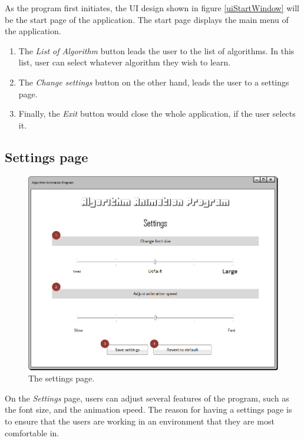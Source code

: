 As the program first initiates, the UI design shown in figure \ref{uiStartWindow} will be the start page of the application. The start page displays the main menu of the application. 

\begin{enumerate}
\item The \textit{List of Algorithm} button leads the user to the list of algorithms. In this list, user can select whatever algorithm they wish to learn. 
\item The \textit{Change settings} button on the other hand, leads the user to a settings page.
\item Finally, the \textit{Exit} button would close the whole application, if the user selects it.
\end{enumerate}

\newpage

\subsection{Settings page}

\begin{figure}[H]
\centering
\hspace*{-0.5cm}
\includegraphics[scale=0.8]{images/report_images/uiSettings.png}
\caption{The settings page.}
\label{uiSettings}
\end{figure}

On the \textit{Settings} page, users can adjust several features of the program, such as the font size, and the animation speed. The reason for having a settings page is to ensure that the users are working in an environment that they are most comfortable in.

